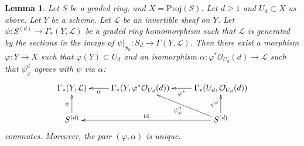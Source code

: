 \documentclass{stacks-project}
\theoremstyle{plain}
\newtheorem{lemma}[subsection]{Lemma}
\theoremstyle{definition}
\theoremstyle{remark}
\numberwithin{equation}{subsection}
\begin{document}
\begin{lemma}
\label{lemma-converse-construction}
Let $S$ be a graded ring, and $X = \text{Proj}(S)$.
Let $d \geq 1$ and $U_d \subset X$ as above.
Let $Y$ be a scheme.
Let $\mathcal{L}$ be an invertible sheaf on $Y$.
Let $\psi : S^{(d)} \to \Gamma_*(Y, \mathcal{L})$ be
a graded ring homomorphism such that $\mathcal{L}$ is
generated by the sections in the image of
$\psi|_{S_d} : S_d \to \Gamma(Y, \mathcal{L})$.
Then there exist a morphism
$\varphi : Y \to X$ such that $\varphi(Y) \subset U_d$ and
an isomorphism $\alpha : \varphi^*\mathcal{O}_{U_d}(d) \to \mathcal{L}$
such that $\psi_\varphi^d$ agrees with $\psi$ via $\alpha$:
$$
\xymatrix{
\Gamma_*(Y, \mathcal{L}) &
\Gamma_*(Y, \varphi^*\mathcal{O}_{U_d}(d)) \ar[l]^-\alpha &
\Gamma_*(U_d, \mathcal{O}_{U_d}(d)) \ar[l]^-{\varphi^*} \\
S^{(d)} \ar[u]^\psi & &
S^{(d)} \ar[u]^{\psi^d} \ar[ul]^{\psi^d_\varphi} \ar[ll]_{\text{id}}
}
$$
commutes. Moreover, the pair $(\varphi, \alpha)$ is unique.
\end{lemma}
\end{document}
